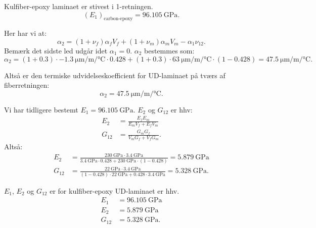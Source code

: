 \begin{derivation}
  \begin{subresult}
    Kulfiber-epoxy laminaet er stivest i 1-retningen.
    \begin{equation*}
      \left( E_1 \right)_{\text{carbon-epoxy}} = \qty{96,105}{\GPa}
    .\end{equation*}
  \end{subresult}

  \derivationpart

  Her har vi at:
  \begin{equation*}
    \alpha_2 = \left( 1 + \nu_f \right) \alpha_f V_f + \left( 1 + \nu_m \right) \alpha_m V_m - \alpha_1 \nu_{12}
  .\end{equation*}
  Bemærk det sidste led udgår idet $\alpha_1 = 0$.
  $\alpha_2$ bestemmes som:
  \begin{equation*}
    \alpha_2 = \left( 1 + \num{0,3}  \right) \cdot \qty{-1,3}{\micro\m\per\m\per\celsius} \cdot \num{0,428}  + \left( 1 + \num{0,3}  \right) \cdot \qty{63}{\micro\m\per\m\per\celsius} \cdot \left( 1 - \num{0,428}  \right) = \qty{47,5}{\micro\m\per\m\per\celsius}
  .\end{equation*}

  \begin{subresult}
    Altså er den termiske udvidelseskoefficient for UD-laminaet på tværs af fiberretningen:
    \begin{equation*}
      \alpha_2 = \qty{47,5}{\micro\m\per\m\per\celsius} 
    .\end{equation*}
  \end{subresult}
  
  \derivationpart

  Vi har tidligere bestemt $E_1 = \qty{96,105}{\GPa}$. $E_2$ og $G_{12}$ er hhv:
  \begin{align*}
    E_2 &= \frac{E_f E_m}{E_m V_f + E_f V_m} \\
    G_{12} &= \frac{G_m G_f}{V_m G_f + V_f G_m}
  .\end{align*}
  Altså:
  \begin{align*}
    E_2 &= \frac{\qty{230}{\GPa} \cdot \qty{3,4}{\GPa} }{\qty{3,4}{\GPa} \cdot \num{0,428} + \qty{230}{\GPa} \cdot \left( 1 - \num{0,428}  \right)}  = \qty{5.879}{\giga\pascal}\\
    G_{12} &= \frac{\qty{22}{\GPa} \cdot \qty{3,4}{\GPa}}{\left( 1- \num{0,428}  \right) \cdot \qty{22}{\GPa}  + \num{0,428} \cdot \qty{3,4}{\GPa} } = \qty{5.328}{\giga\pascal}
  .\end{align*}

  \begin{subresult}
    $E_1$, $E_2$ og $G_{12}$ er for kulfiber-epoxy UD-laminaet er hhv.
    \begin{align*}
      E_1 &= \qty{96,105}{\GPa}  \\
      E_2 &= \qty{5,879}{\GPa}  \\
      G_{12} &= \qty{5,328}{\GPa}
    .\end{align*}
  \end{subresult}


\end{derivation}

